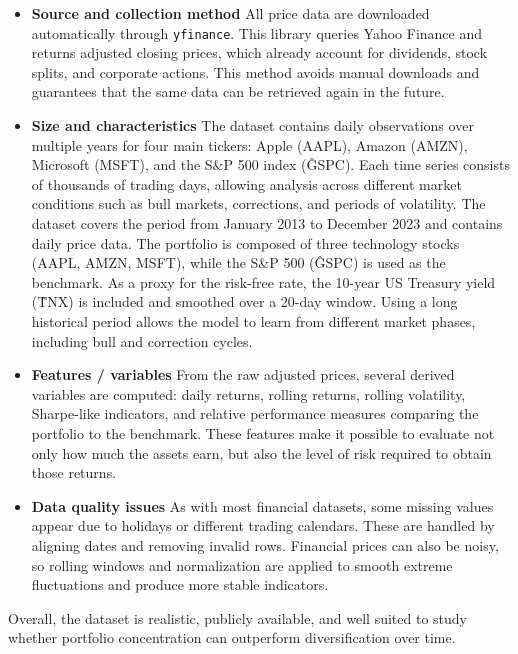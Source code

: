 \documentclass[11pt,a4paper]{article}
\begin{document}
\begin{itemize}

\item \textbf{Source and collection method}  
All price data are downloaded automatically through \texttt{yfinance}. This library queries Yahoo Finance and returns adjusted closing prices, which already account for dividends, stock splits, and corporate actions. This method avoids manual downloads and guarantees that the same data can be retrieved again in the future.

\item \textbf{Size and characteristics} The dataset contains daily observations over multiple years for four main tickers: Apple (AAPL), Amazon (AMZN), Microsoft (MSFT), and the S\&P 500 index (\^GSPC). Each time series consists of thousands of trading days, allowing analysis across different market conditions such as bull markets, corrections, and periods of volatility. The dataset covers the period from January 2013 to December 2023 and contains daily price data. The portfolio is composed of three technology stocks (AAPL, AMZN, MSFT), while the S\&P 500 (\^GSPC) is used as the benchmark. As a proxy for the risk-free rate, the 10-year US Treasury yield (\^TNX) is included and smoothed over a 20-day window. Using a long historical period allows the model to learn from different market phases, including bull and correction cycles.

\item \textbf{Features / variables}  
From the raw adjusted prices, several derived variables are computed: daily returns, rolling returns, rolling volatility, Sharpe-like indicators, and relative performance measures comparing the portfolio to the benchmark. These features make it possible to evaluate not only how much the assets earn, but also the level of risk required to obtain those returns.

\item \textbf{Data quality issues}  
As with most financial datasets, some missing values appear due to holidays or different trading calendars. These are handled by aligning dates and removing invalid rows. Financial prices can also be noisy, so rolling windows and normalization are applied to smooth extreme fluctuations and produce more stable indicators.

\end{itemize}

\noindent Overall, the dataset is realistic, publicly available, and well suited to study whether portfolio concentration can outperform diversification over time.
\end{document}
